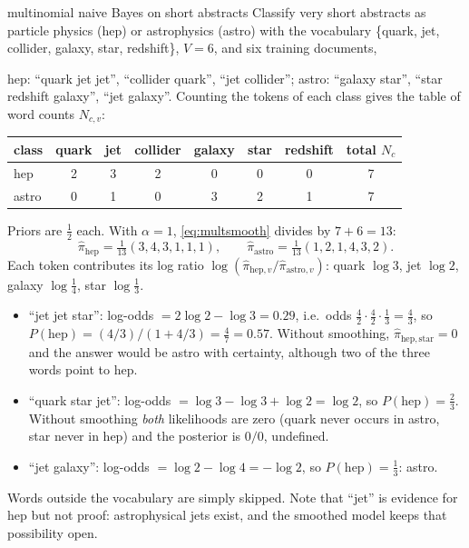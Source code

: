 \documentclass[11pt]{article}
\begin{document}
\begin{worked}{multinomial naive Bayes on short abstracts}
Classify very short abstracts as particle physics (hep) or astrophysics (astro) with the vocabulary
\{quark, jet, collider, galaxy, star, redshift\}, $V = 6$, and six training documents,

hep: ``quark jet jet'', ``collider quark'', ``jet collider''; astro: ``galaxy star'', ``star redshift galaxy'',
``jet galaxy''. Counting the tokens of each class gives the table of word counts $N_{c,v}$:

\begin{center}\small
\begin{tabular}{@{}lccccccc@{}}\toprule
class & quark & jet & collider & galaxy & star & redshift & total $N_c$ \\ \midrule
hep & 2 & 3 & 2 & 0 & 0 & 0 & 7 \\
astro & 0 & 1 & 0 & 3 & 2 & 1 & 7 \\ \bottomrule
\end{tabular}
\end{center}

Priors are $\tfrac12$ each. With $\alpha = 1$, \eqref{eq:multsmooth} divides by $7 + 6 = 13$:
\[
  \hat\pi_{\mathrm{hep}} = \tfrac{1}{13}(3, 4, 3, 1, 1, 1), \qquad
  \hat\pi_{\mathrm{astro}} = \tfrac{1}{13}(1, 2, 1, 4, 3, 2) .
\]
Each token contributes its log ratio $\log(\hat\pi_{\mathrm{hep},v}/\hat\pi_{\mathrm{astro},v})$:
quark $\log 3$, jet $\log 2$, galaxy $\log\tfrac14$, star $\log\tfrac13$.
\begin{itemize}
\item ``jet jet star'': log-odds $= 2\log 2 - \log 3 = 0.29$, i.e.\ odds $\tfrac42 \cdot \tfrac42 \cdot \tfrac13 = \tfrac43$, so
$P(\mathrm{hep}) = (4/3)/(1 + 4/3) = \tfrac47 = 0.57$.
Without smoothing, $\hat\pi_{\mathrm{hep,star}} = 0$ and the answer would be astro with certainty, although two of the
three words point to hep.
\item ``quark star jet'': log-odds $= \log 3 - \log 3 + \log 2 = \log 2$, so $P(\mathrm{hep}) = \tfrac23$. Without
smoothing \emph{both} likelihoods are zero (quark never occurs in astro, star never in hep) and the posterior is
$0/0$, undefined.
\item ``jet galaxy'': log-odds $= \log 2 - \log 4 = -\log 2$, so $P(\mathrm{hep}) = \tfrac13$: astro.
\end{itemize}
Words outside the vocabulary are simply skipped. Note that ``jet'' is evidence for hep but not proof: astrophysical
jets exist, and the smoothed model keeps that possibility open.
\end{worked}
\end{document}
